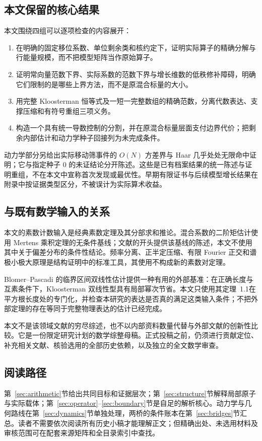 \subsection{本文保留的核心结果}
本文围绕四组可以逐项检查的内容展开：
\begin{enumerate}
\item 在明确的固定移位系数、单位剩余类和核约定下，证明实际算子的精确分解与行能量规模，而不把模型矩阵当作原始算子。
\item 证明常向量范数下界、实际系数的范数下界与增长维数的低秩修补障碍，明确它们限制的是哪些上界方法，而不是原混合标量的大小。
\item 用完整 Kloosterman 恒等式及一短一完整数组的精确范数，分离代数表达、支撑压缩和有符号重组三项义务。
\item 构造一个具有统一导数控制的分割，并在原混合标量层面支付边界代价；把剩余内部估计和动力学种子回接列为未完成条件。
\end{enumerate}
动力学部分另给出实际移动筛事件的 $O(N)$ 方差界与 Haar 几乎处处无限命中证明；它与指定种子 $0$ 的未证结论分开陈述。这些是已有档案结果的统一陈述与证明重组，不在本文中宣称首次发现或最优性。早期有限证书与后续模型增长结果在附录中按证据类型区分，不被误计为实际算术收益。

\subsection{与既有数学输入的关系}
本文的素数计数输入是经典素数定理及其分部求和推论\cite{selberg1949}。混合系数的二阶矩估计使用 Mertens 乘积定理的无条件基线；文献\cite{lamzouri2015}的开头提供该基线的陈述，本文不使用其中关于偏差分布的条件性结论。频率分离、正半定压缩、有限 Fourier 正交和谱极小极大原理是结构证明中的标准工具，其使用不构成新的素数对定理。

Blomer--Pascadi 的临界区间双线性估计\cite{blomer2026}提供一种有用的外部基准：在正确长度与互素条件下，Kloosterman 双线性型具有局部幂次节省。本文只使用其定理~1.1在平方根长度处的专门化，并检查本研究的表达是否真的满足这类输入条件；不把外部定理的存在等同于完整物理表达的估计已经完成。

本文不是该领域文献的穷尽综述，也不以内部资料数量代替与外部文献的创新性比较。它是一份限定研究计划的数学综整母稿。正式投稿之前，仍须进行贡献定位、补充相关文献、核验选用的全部历史依赖，以及独立的全文数学审查。

\subsection{阅读路径}
第~\ref{sec:arithmetic}节给出共同目标和证据层次；第~\ref{sec:structure}节解释局部原子与实际载体；第~\ref{sec:operator}--\ref{sec:boundary}节是自足的解析核心。动力学与几何路线在第~\ref{sec:dynamics}节单独处理，两桥的条件账本在第~\ref{sec:bridges}节汇总。读者不需要依次阅读所有历史小稿才能理解正文；但精确出处、未选用材料及审核范围可在配套来源矩阵和全目录索引中查找。
